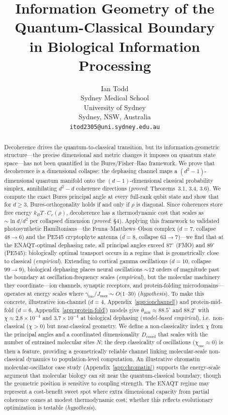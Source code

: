\documentclass[12pt,a4paper]{article}
\title{Information Geometry of the Quantum-Classical Boundary\\ in Biological Information Processing}
\author{Ian Todd\\
Sydney Medical School\\
University of Sydney\\
Sydney, NSW, Australia\\
\texttt{itod2305@uni.sydney.edu.au}}
\date{}
\theoremstyle{definition}
\theoremstyle{remark}
\begin{document}
\maketitle

\begin{abstract}
Decoherence drives the quantum-to-classical transition, but its information-geometric structure---the precise dimensional and metric changes it imposes on quantum state space---has not been quantified in the Bures/Fisher--Rao framework. We prove that decoherence is a dimensional collapse: the dephasing channel maps a $(d^2{-}1)$-dimensional quantum manifold onto the $(d{-}1)$-dimensional classical probability simplex, annihilating $d^2{-}d$ coherence directions (\emph{proved}: Theorems~3.1, 3.4, 3.6). We compute the exact Bures principal angle at every full-rank qubit state and show that for $d \geq 3$, Bures-orthogonality holds if and only if $\rho$ is diagonal. Since coherences store free energy $k_BT \cdot C_r(\rho)$, decoherence has a thermodynamic cost that scales as $\sim \ln d / d^2$ per collapsed dimension (\emph{proved}: \S4). Applying this framework to validated photosynthetic Hamiltonians---the Fenna--Matthews--Olson complex ($d = 7$, collapse $48 \to 6$) and the PE545 cryptophyte antenna ($d = 8$, collapse $63 \to 7$)---we find that at the ENAQT-optimal dephasing rate, all principal angles exceed $87^\circ$ (FMO) and $89^\circ$ (PE545): biologically optimal transport occurs in a regime that is geometrically close to classical (\emph{empirical}). Extending to cortical gamma oscillations ($d = 10$, collapse $99 \to 9$), biological dephasing places neural oscillations ${\sim}12$ orders of magnitude past the boundary at oscillation-frequency scales (\emph{empirical}), but the molecular machinery they coordinate---ion channels, synaptic receptors, and protein-folding microdomains---operates at energy scales where $\gamma_{\mathrm{bio}}/J_{\max} \sim O(1$--$30)$ (\emph{hypothesis}). To make this concrete, illustrative ion-channel ($d = 4$, Appendix~\ref{app:ionchannel}) and protein-mid-fold ($d = 6$, Appendix~\ref{app:protein-fold}) models give $\theta_{\min} \approx 88.5^\circ$ and $88.2^\circ$ with $\chi \approx 2.8\times10^{-4}$ and $3.7\times10^{-4}$ at biological dephasing (\emph{model-based empirical}), i.e.\ non-classical ($\chi>0$) but near-classical geometry. We define a non-classicality index $\chi$ from the principal angles and a coordinated dimensionality $D_{\mathrm{coord}}$ that scales with the number of entrained molecular sites $N$; the deep classicality of oscillations ($\chi_{\mathrm{osc}} \approx 0$) is then a feature, providing a geometrically reliable channel linking molecular-scale non-classical dynamics to population-level computation. An illustrative chromatin molecular-oscillator case study (Appendix~\ref{app:chromatin}) supports the energy-scale argument that molecular biology can sit near the quantum-classical boundary, though the geometric position is sensitive to coupling strength. The ENAQT regime may represent a cost-benefit sweet spot where extra dimensional capacity from partial coherence comes at modest thermodynamic cost; whether this reflects evolutionary optimization is testable (\emph{hypothesis}).
\end{abstract}
\end{document}
